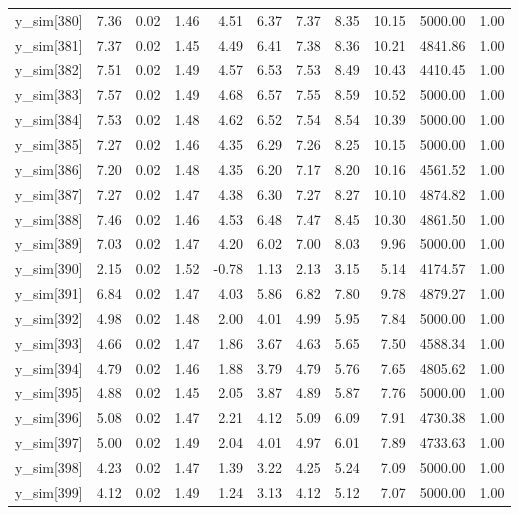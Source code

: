 \begin{table}[ht]
\begin{tabular}{rrrrrrrrrrr}
  y\_sim[380] & 7.36 & 0.02 & 1.46 & 4.51 & 6.37 & 7.37 & 8.35 & 10.15 & 5000.00 & 1.00 \\ 
  y\_sim[381] & 7.37 & 0.02 & 1.45 & 4.49 & 6.41 & 7.38 & 8.36 & 10.21 & 4841.86 & 1.00 \\ 
  y\_sim[382] & 7.51 & 0.02 & 1.49 & 4.57 & 6.53 & 7.53 & 8.49 & 10.43 & 4410.45 & 1.00 \\ 
  y\_sim[383] & 7.57 & 0.02 & 1.49 & 4.68 & 6.57 & 7.55 & 8.59 & 10.52 & 5000.00 & 1.00 \\ 
  y\_sim[384] & 7.53 & 0.02 & 1.48 & 4.62 & 6.52 & 7.54 & 8.54 & 10.39 & 5000.00 & 1.00 \\ 
  y\_sim[385] & 7.27 & 0.02 & 1.46 & 4.35 & 6.29 & 7.26 & 8.25 & 10.15 & 5000.00 & 1.00 \\ 
  y\_sim[386] & 7.20 & 0.02 & 1.48 & 4.35 & 6.20 & 7.17 & 8.20 & 10.16 & 4561.52 & 1.00 \\ 
  y\_sim[387] & 7.27 & 0.02 & 1.47 & 4.38 & 6.30 & 7.27 & 8.27 & 10.10 & 4874.82 & 1.00 \\ 
  y\_sim[388] & 7.46 & 0.02 & 1.46 & 4.53 & 6.48 & 7.47 & 8.45 & 10.30 & 4861.50 & 1.00 \\ 
  y\_sim[389] & 7.03 & 0.02 & 1.47 & 4.20 & 6.02 & 7.00 & 8.03 & 9.96 & 5000.00 & 1.00 \\ 
  y\_sim[390] & 2.15 & 0.02 & 1.52 & -0.78 & 1.13 & 2.13 & 3.15 & 5.14 & 4174.57 & 1.00 \\ 
  y\_sim[391] & 6.84 & 0.02 & 1.47 & 4.03 & 5.86 & 6.82 & 7.80 & 9.78 & 4879.27 & 1.00 \\ 
  y\_sim[392] & 4.98 & 0.02 & 1.48 & 2.00 & 4.01 & 4.99 & 5.95 & 7.84 & 5000.00 & 1.00 \\ 
  y\_sim[393] & 4.66 & 0.02 & 1.47 & 1.86 & 3.67 & 4.63 & 5.65 & 7.50 & 4588.34 & 1.00 \\ 
  y\_sim[394] & 4.79 & 0.02 & 1.46 & 1.88 & 3.79 & 4.79 & 5.76 & 7.65 & 4805.62 & 1.00 \\ 
  y\_sim[395] & 4.88 & 0.02 & 1.45 & 2.05 & 3.87 & 4.89 & 5.87 & 7.76 & 5000.00 & 1.00 \\ 
  y\_sim[396] & 5.08 & 0.02 & 1.47 & 2.21 & 4.12 & 5.09 & 6.09 & 7.91 & 4730.38 & 1.00 \\ 
  y\_sim[397] & 5.00 & 0.02 & 1.49 & 2.04 & 4.01 & 4.97 & 6.01 & 7.89 & 4733.63 & 1.00 \\ 
  y\_sim[398] & 4.23 & 0.02 & 1.47 & 1.39 & 3.22 & 4.25 & 5.24 & 7.09 & 5000.00 & 1.00 \\ 
  y\_sim[399] & 4.12 & 0.02 & 1.49 & 1.24 & 3.13 & 4.12 & 5.12 & 7.07 & 5000.00 & 1.00 \\ 

\end{tabular}
\end{table}
